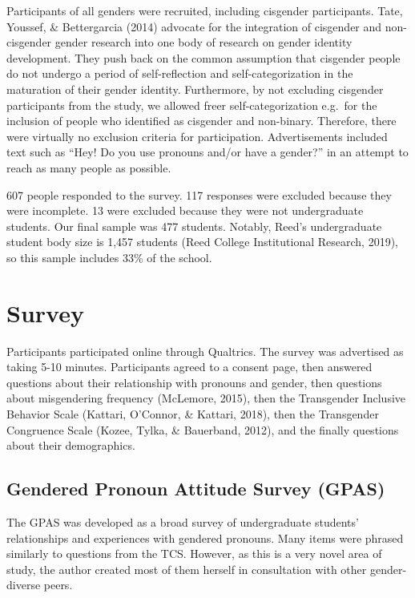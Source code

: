 \documentclass[12pt,twoside]{reedthesis}
\begin{document}
Participants of all genders were recruited, including cisgender participants. Tate, Youssef, \& Bettergarcia (2014) advocate for the integration of cisgender and non-cisgender gender research into one body of research on gender identity development. They push back on the common assumption that cisgender people do not undergo a period of self-reflection and self-categorization in the maturation of their gender identity. Furthermore, by not excluding cisgender participants from the study, we allowed freer self-categorization e.g.~for the inclusion of people who identified as cisgender and non-binary. Therefore, there were virtually no exclusion criteria for participation. Advertisements included text such as ``Hey! Do you use pronouns and/or have a gender?'' in an attempt to reach as many people as possible.

607 people responded to the survey. 117 responses were excluded because they were incomplete. 13 were excluded because they were not undergraduate students. Our final sample was 477 students. Notably, Reed's undergraduate student body size is 1,457 students (Reed College Institutional Research, 2019), so this sample includes 33\% of the school.

\hypertarget{survey}{%
\section{Survey}\label{survey}}

Participants participated online through Qualtrics. The survey was advertised as taking 5-10 minutes. Participants agreed to a consent page, then answered questions about their relationship with pronouns and gender, then questions about misgendering frequency (McLemore, 2015), then the Transgender Inclusive Behavior Scale (Kattari, O'Connor, \& Kattari, 2018), then the Transgender Congruence Scale (Kozee, Tylka, \& Bauerband, 2012), and the finally questions about their demographics.

\hypertarget{gendered-pronoun-attitude-survey-gpas}{%
\subsection{Gendered Pronoun Attitude Survey (GPAS)}\label{gendered-pronoun-attitude-survey-gpas}}

The GPAS was developed as a broad survey of undergraduate students' relationships and experiences with gendered pronouns. Many items were phrased similarly to questions from the TCS. However, as this is a very novel area of study, the author created most of them herself in consultation with other gender-diverse peers.
\end{document}
